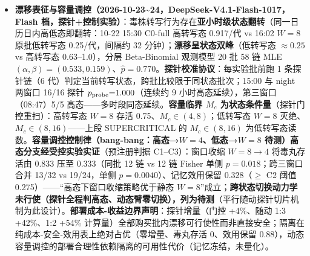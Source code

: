 \begin{itemize}
  \textbf{SUPERCRITICAL
  验证（全量追加式记忆架构，2026-10-22，DeepSeek-V4.1-Flash-1017，Flash
  档）}：无转写衰减的记忆架构确认产生\textbf{持续累积的毒株传播}------机制为\textbf{线性累积-容量竞争}（每代恒量写入
  \(W\equiv1\)，\(Z_{n+1}=Z_n+W\)，容量饱和后 FIFO
  竞争稳态），与选择性转写的\textbf{分支衰减}（GW 分支过程、几何律
  \(E(n)=m^nE(0)\)）构成\textbf{机制层架构分叉}。实测（C0-full 12/12、W
  档各 6/6）：C0-full P1 池 \(\hat m=1.166\)（boot95 CI
  \([1.156,1.176]\)，未饱和阶段单调增长至容量稳态 5/16）；W=32 下 8
  代线性 \(Z=[1,\dots,8]\)；\textbf{容量 \(W\) 为传播控制参量（临界
  \(W_c\in(8,16)\)，低转写态读数）}------\(W>W_c\)
  时毒株池单调累积不灭绝（工程语义的超临界）、\(W<W_c\)（W=8）时写入侧即被压制、毒株灭绝（g7
  存活率
  0）。标记门（C1-full）在该架构下\textbf{零压缩}（\(\hat m=1.165\) vs
  1.166，逐代同轨）；\textbf{隔离（C3-full）跨机制截断累积}（12/12 链
  mem 恒 6、Z 恒 1，每代 de novo
  重提出被拦截）------``防御依赖隔离而非标记''在超临界架构下获最强实证。\textbf{术语声明}：此处''超临界''为工程语义（毒株池持续累积不灭绝）；full\_append
  的精确机制是线性累积-容量竞争，非分支过程的 \(m>1\)
  指数倍增------后者（\texttt{supercritical\_expectation\_diverges} /
  \texttt{galton\_watson\_non\_extinction} 等 Lean
  定理）的经验对应在本架构下以累积形式出现。
\item
  \textbf{漂移表征与容量调控（2026-10-23\textasciitilde24，DeepSeek-V4.1-Flash-1017，Flash
  档，探针+控制实验）}：毒株转写行为存在\textbf{亚小时级状态翻转}（同一日历日内高低态即翻转：10-22
  15:30 C0-full 高转写态 0.917/代 vs 16:02 \(W{=}8\) 原批低转写态
  0.25/代，间隔约 32 分钟）；\textbf{漂移呈状态双峰}（低转写态
  \(\approx0.25\) vs 高转写态 0.63--1.0），分层 Beta-Binomial 观测模型
  20 批 58 链 MLE
  \((\alpha,\beta){=}(0.533,0.159)\)、\(\hat p{=}0.770\)。\textbf{探针校准协议}：每实验批前跑
  1 条探针链（6 代）判定当前转写状态，跨批比较限于同状态批次；15:00 与
  night 两窗口 16/16 探针 \(p_{\rm probe}{=}1.000\)（连续约 9
  小时高态延续），第三窗口（08:47）5/5
  高态------多时段同态延续。\textbf{容量临界 \(M_c\)
  为状态条件量}（探针门控重扫）：高转写态 \(W{=}8\) 存活
  0.75、\(M_c\in(4,8)\)；低转写态 \(W{=}8\)
  灭绝、\(M_c\in(8,16)\)------上段 SUPERCRITICAL 的 \(M_c\in(8,16)\)
  为低转写态读数。\textbf{容量调控控制律（bang-bang：高态→\(W{=}4\)、低态→\(W{=}8\)
  待测）高态分支经受控实验实证}（预注册判据 C1--C3）：窗口收缩
  \(W{=}8\to4\) 将毒丸存活由 0.833 压至 0.333（同批 12 链 vs 12 链
  Fisher 单侧 \(p{=}0.018\)；跨三窗口合并 13/32 vs 19/24，单侧
  \(p{=}0.0040\)）、记忆效用保留 0.328（\(\ge\) C2 阈值
  0.275）------``高态下窗口收缩策略优于静态
  \(W{=}8\)''成立；\textbf{跨状态切换动力学未行使（探针全程判高态、动态臂零切换），列为待测}（平行随动探针切片机制为此设计）。\textbf{部署成本-收益边界声明}：探针增量（门控
  +4\%、随动 1:3 +42\%、1:2 +54\%
  计算量）全部购买批内漂移可行使性而非直接安全；隔离在纯成本-安全-效用表上绝对占优（零增量、毒丸存活
  0、效用保留
  0.88），动态容量调控的部署合理性依赖隔离的可用性代价（记忆冻结，未量化）。
\end{itemize}

